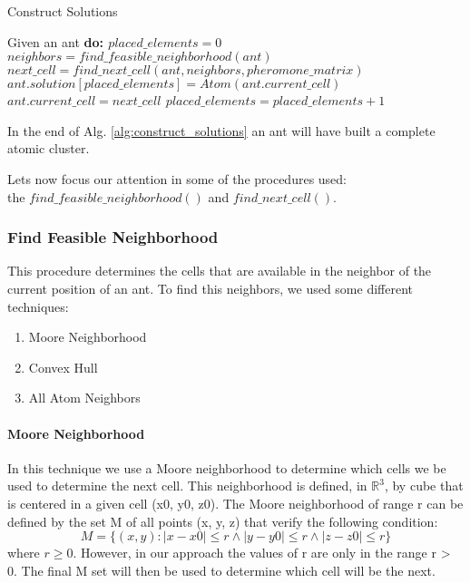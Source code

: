	\begin{algorithm}
		\caption{Construct Solutions}
		\label{alg:construct_solutions}
		\begin{algorithmic}
		\STATE Given an ant \bf{do}:
		\STATE $placed\_elements = 0$
			\STATE $neighbors = find\_feasible\_neighborhood(ant)$
			\STATE $next\_cell = find\_next\_cell(ant, neighbors, pheromone\_matrix)$
			\STATE $ant.solution[placed\_elements] = Atom(ant.current\_cell)$
			\STATE $ant.current\_cell = next\_cell$
			\STATE $placed\_elements = placed\_elements + 1$			
		\ENDWHILE
		\end{algorithmic}
	\end{algorithm}
	
	In the end of Alg. \ref{alg:construct_solutions} an ant will have built a complete atomic cluster.
	
	Lets now focus our attention in some of the procedures used:\\ the $find\_feasible\_neighborhood()$ and $find\_next\_cell()$. 
	
		\subsubsection*{Find Feasible Neighborhood}
		This procedure determines the cells that are available in the neighbor of the current position of an ant. To find this neighbors, we used some different techniques:
		\begin{enumerate}
			\item Moore Neighborhood
			\item Convex Hull
			\item All Atom Neighbors
		\end{enumerate}
	
		\paragraph*{Moore Neighborhood}
			
			In this technique we use a Moore neighborhood to determine which cells we be used to determine the next cell. 
			This neighborhood is defined, in $\mathbb{R}^3$, by cube that is centered in a given cell (x0, y0, z0). The Moore neighborhood of range r can be defined by the set M of all points (x, y, z) that verify the following condition:
			\begin{equation}
				M= \{(x,y):|x-x0| \leq r \wedge |y-y0| \leq r \wedge |z-z0| \leq r\}
			\end{equation}
			where $r \geq 0$. However, in our approach the values of r are only in the range r > 0.
			The final M set will then be used to determine which cell will be the next.
